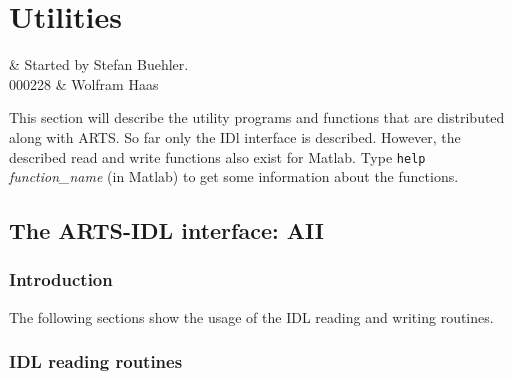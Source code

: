 %
%
\chapter{Utilities}
 \label{sec:utilities}

%
%
 & Started by Stefan Buehler.\\
  000228 & Wolfram Haas
\stophistory


This section will describe the utility programs and functions that are
distributed along with ARTS. So far only the IDl interface is
described.  However, the described read and write functions also exist
for Matlab.  Type \verb|help| {\it function\_name} (in Matlab) to get
some information about the functions.



\section{The ARTS-IDL interface: AII}
\label{sec:utilities:aii}

\subsection{Introduction}
The following sections show the usage of the IDL reading and writing
routines.
\subsection{IDL reading routines}
